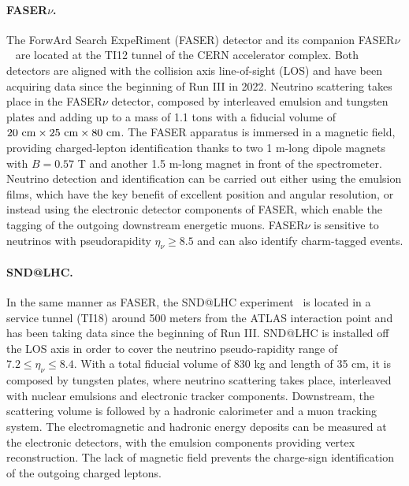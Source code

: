 \paragraph{FASER$\nu$.}
%
The ForwArd Search ExpeRiment (FASER) detector
and its companion FASER$\nu$~\cite{FASER:2019aik,FASER:2019dxq,FASER:2023zcr,FASER:2022hcn}
are located at the TI12 tunnel of the CERN accelerator complex.
%
Both detectors are aligned
with the collision axis line-of-sight (LOS)
and have been acquiring data since the beginning of Run III in 2022.
%
Neutrino scattering takes place in the FASER$\nu$ 
detector, composed by interleaved emulsion and tungsten plates and
adding up to a mass of 1.1 tons with a fiducial volume of $20~\rm{cm} \times 25~\rm{cm} \times 80~{\rm cm}$.
%
The FASER apparatus is immersed in a magnetic field,  providing charged-lepton
identification thanks to two 1 m-long dipole magnets with $B=0.57$ T
and another 1.5 m-long magnet in front of the spectrometer. 
%
Neutrino detection and identification can be carried out either using the emulsion
films, which have the key benefit of excellent position and angular resolution,
or instead using the electronic detector components of FASER, which enable the tagging
of the outgoing downstream energetic muons.
%
FASER$\nu$ is sensitive to neutrinos with pseudorapidity $\eta_\nu \ge 8.5$
and can also identify charm-tagged events.


\paragraph{SND@LHC.}
%
In the same manner as FASER, the SND@LHC experiment~\cite{SNDLHC:2022ihg}
is located in a service tunnel (TI18)
around 500 meters from the ATLAS interaction point and has been taking data
since the  beginning of Run III.
%
SND@LHC is installed off the LOS axis in order to cover the neutrino
pseudo-rapidity range of $7.2 \le \eta_\nu \le 8.4$.
%
With a total fiducial volume of 830 kg and length of 35 cm, it is composed by tungsten plates,
where neutrino scattering takes place, interleaved with nuclear emulsions and electronic tracker
components.
%
Downstream, the scattering volume is followed by a hadronic calorimeter and a muon tracking system.
%
The electromagnetic
 and hadronic energy deposits can be measured at the electronic detectors, with the emulsion
 components providing vertex reconstruction.
 The lack of magnetic field prevents the charge-sign identification of the outgoing charged leptons.


